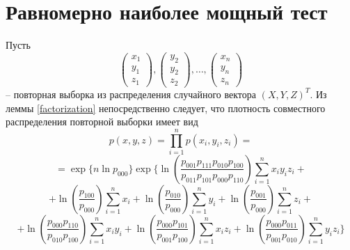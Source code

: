 \documentclass[a4paper,14pt]{extarticle}
\theoremstyle{definition}
\begin{document}
\section{Равномерно наиболее мощный тест}
Пусть
$$
    \begin{pmatrix}
        x_1 \\
        y_1 \\
        z_1
    \end{pmatrix},
    \begin{pmatrix}
        y_2 \\
        y_2 \\
        z_2
    \end{pmatrix}, \ldots,
    \begin{pmatrix}
        x_n \\
        y_n \\
        z_n
    \end{pmatrix}
$$ -- повторная выборка из распределения случайного вектора $(X,Y,Z)^T$.
Из леммы \ref{factorization} непосредственно следует, что плотность совместного распределения повторной выборки имеет вид
$$p(x,y,z) = \prod_{i=1}^n p(x_i,y_i,z_i) =$$
$$
        = \exp \Biggl\{ n \ln p_{000}\Biggr\}
        \exp \Biggl\{ \ln  \left(\dfrac{p_{001}p_{111}p_{010}p_{100}}{p_{011}p_{101}p_{000}p_{110}}\right) \sum_{i=1}^n x_i y_i z_i +$$
    $$ +
        \ln\left(\dfrac{p_{100}}{p_{000}}\right) \sum_{i=1}^{n} x_i + \ln\left(\dfrac{p_{010}}{p_{000}}\right) \sum_{i=1}^{n} y_i +
        \ln\left(\dfrac{p_{001}}{p_{000}}\right) \sum_{i=1}^{n} z_i +
    $$
    $$
        +\ln \left(\dfrac{p_{000}p_{110}}{p_{010}p_{100}}\right) \sum_{i=1}^n x_i y_i +
        \ln \left(\dfrac{p_{000}p_{101}}{p_{001}p_{100}}\right) \sum_{i=1}^n x_i z_i +
        \ln \left(\dfrac{p_{000}p_{011}}{p_{001}p_{010}}\right) \sum_{i=1}^n y_i z_i \Biggr\}
    $$
\end{document}
